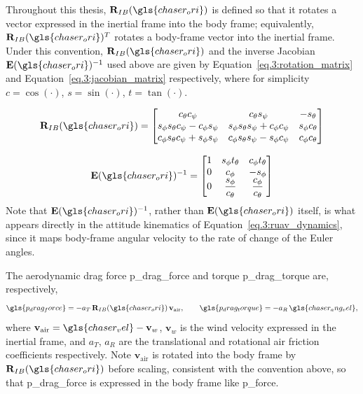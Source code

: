 Throughout this thesis, $\mathbf{R}_{IB}(\gls{chaser_ori})$ is defined so that it rotates a vector
expressed in the inertial frame into the body frame; equivalently, $\mathbf{R}_{IB}(\gls{chaser_ori})^T$
rotates a body-frame vector into the inertial frame. Under this convention,
$\mathbf{R}_{IB}(\gls{chaser_ori})$ and the inverse Jacobian $\mathbf{E}(\gls{chaser_ori})^{-1}$ used above are given by
Equation~\eqref{eq.3:rotation_matrix} and Equation~\eqref{eq.3:jacobian_matrix}
respectively, where for simplicity $c=\cos(\cdot)$, $s=\sin(\cdot)$, $t=\tan(\cdot)$.

\begin{equation}
\mathbf{R}_{IB}(\gls{chaser_ori}) =
\begin{bmatrix}
c_\theta c_\psi &
c_\theta s_\psi &
- s_\theta \\
s_\phi s_\theta c_\psi - c_\phi s_\psi &
s_\phi s_\theta s_\psi + c_\phi c_\psi &
s_\phi c_\theta \\
c_\phi s_\theta c_\psi + s_\phi s_\psi &
c_\phi s_\theta s_\psi - s_\phi c_\psi &
c_\phi c_\theta
\end{bmatrix}
\label{eq.3:rotation_matrix}
\end{equation}

\begin{equation}
\mathbf{E}(\gls{chaser_ori})^{-1} =
\begin{bmatrix}
1 & s_\phi t_\theta & c_\phi t_\theta \\
0 & c_\phi & -s_\phi \\
0 & \dfrac{s_\phi}{c_\theta} & \dfrac{c_\phi}{c_\theta}
\end{bmatrix}
\label{eq.3:jacobian_matrix}
\end{equation}
Note that $\mathbf{E}(\gls{chaser_ori})^{-1}$, rather than $\mathbf{E}(\gls{chaser_ori})$ itself, is what appears directly in
the attitude kinematics of Equation~\eqref{eq.3:ruav_dynamics}, since it maps
body-frame angular velocity to the rate of change of the Euler angles.

The aerodynamic drag force \gls{p_drag_force} and torque \gls{p_drag_torque} are,
respectively,
\begin{equation}
\gls{p_drag_force} = -a_T\, \mathbf{R}_{IB}(\gls{chaser_ori})\, \mathbf{v}_{\mathrm{air}}, \qquad
\gls{p_drag_torque} = -a_R\, \gls{chaser_ang_vel},
\end{equation}
where $\mathbf{v}_{\mathrm{air}} = \gls{chaser_vel} - \mathbf{v}_w$, $\mathbf{v}_w$ is the wind velocity expressed in
the inertial frame, and $a_T$, $a_R$ are the translational and rotational air
friction coefficients respectively. Note $\mathbf{v}_{\mathrm{air}}$ is rotated into the body frame
by $\mathbf{R}_{IB}(\gls{chaser_ori})$ before scaling, consistent with the convention above, so that
\gls{p_drag_force} is expressed in the body frame like \gls{p_force}.

